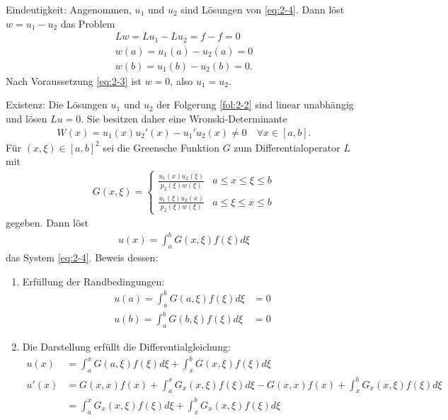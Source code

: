 \begin{beweis}
  Eindeutigkeit: Angenommen, $u_{1}$ und $u_{2}$ sind Lösungen von \eqref{eq:2-4}. Dann löst $w = u_{1} - u_{2}$ das Problem
  \begin{align*}
    Lw = Lu_{1} - Lu_{2} = f-f = 0\\
    w(a) = u_{1}(a) - u_{2}(a) =0 \\
    w(b) = u_{1}(b) - u_{2}(b) =0. 
  \end{align*}
Nach Voraussetzung \eqref{eq:2-3} ist $w = 0$, also $u_{1} = u_{2}$. 

Existenz: Die Lösungen $u_{1}$ und $u_{2}$ der Folgerung \ref{fol:2-2} sind linear unabhängig und lösen $Lu = 0$. Sie besitzen daher eine Wronski-Determinante
\begin{align*}
  W(x) = u_{1}(x) u_{2}' (x) - u_{1}' u_{2}(x) \neq 0 \quad \forall x \in [a, b]. 
\end{align*}
Für $(x, \xi) \in [a, b]^{2}$ sei die Greensche Funktion $G$ zum Differentialoperator $L$ mit
\begin{align*}
  G(x, \xi) =
  \begin{cases}
    \frac{u_{1}(x) u_{2}(\xi)}{p_{2}(\xi) w(\xi)} & a \leq x \leq \xi \leq b\\
    \frac{u_{1}(\xi) u_{2}(x)}{p_{2}(\xi) w(\xi)} & a \leq \xi \leq x \leq b
  \end{cases}
\end{align*}
gegeben. Dann löst
\begin{align*}
  u(x) = \int_{a}^{b} G(x, \xi)f(\xi) d\xi
\end{align*}
das System \eqref{eq:2-4}.
Beweis dessen: 
\begin{enumerate}
\item Erfüllung der Randbedingungen: 
  \begin{align*}
    u(a) = \int_{a}^{b} G(a, \xi)f(\xi) d\xi &= 0\\
    u(b) = \int_{a}^{b} G(b, \xi)f(\xi) d\xi &= 0
  \end{align*}
\item Die Darstellung erfüllt die Differentialgleichung:
  \begin{align*}
    u(x) &= \int_{a}^{x} G(a, \xi)f(\xi) d\xi  + \int_{x}^{b} G(x, \xi)f(\xi) d\xi\\
    u'(x) &= G(x, x) f(x) + \int_{a}^{x} G_{x}(x, \xi)f(\xi) d\xi  - G(x, x)f(x)  + \int_{x}^{b} G_{x}(x, \xi)f(\xi) d\xi \\
    &= \int_{a}^{x} G_{x}(x, \xi)f(\xi) d\xi    + \int_{x}^{b} G_{x}(x, \xi)f(\xi) d\xi\\

\end{align*}
\end{enumerate}
\end{beweis}
